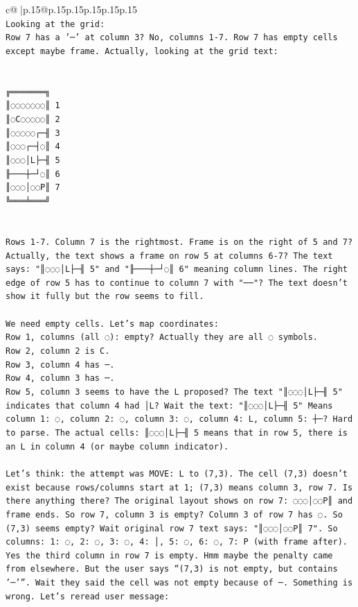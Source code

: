 \documentclass{article}
\begin{document}
{\begin{supertabular}{c@{$\;$}|p{.15\linewidth}@{}p{.15\linewidth}p{.15\linewidth}p{.15\linewidth}p{.15\linewidth}p{.15\linewidth}}
{{{\\ 
\texttt{Looking at the grid:  } \\
\texttt{Row 7 has a '─' at column 3? No, columns 1{-}7. Row 7 has empty cells except maybe frame. Actually, looking at the grid text:  } \\
\\ 
\\ 
\texttt{╔═══════╗} \\
\texttt{║◌◌◌◌◌◌◌║ 1} \\
\texttt{║◌C◌◌◌◌◌║ 2} \\
\texttt{║◌◌◌◌◌┌─╢ 3} \\
\texttt{║◌◌◌┌─┤◌║ 4} \\
\texttt{║◌◌◌│L├─╢ 5} \\
\texttt{╟───┼─┘◌║ 6} \\
\texttt{║◌◌◌│◌◌P║ 7} \\
\texttt{╚═══╧═══╝} \\
\\ 
\\ 
\texttt{Rows 1{-}7. Column 7 is the rightmost. Frame is on the right of 5 and 7?  } \\
\texttt{Actually, the text shows a frame on row 5 at columns 6{-}7? The text says: "║◌◌◌│L├─╢ 5" and "╟───┼─┘◌║ 6" meaning column lines. The right edge of row 5 has to continue to column 7 with "──"? The text doesn't show it fully but the row seems to fill.  } \\
\\ 
\texttt{We need empty cells. Let's map coordinates:  } \\
\texttt{Row 1, columns (all ◌): empty? Actually they are all ◌ symbols.  } \\
\texttt{Row 2, column 2 is C.  } \\
\texttt{Row 3, column 4 has ─.  } \\
\texttt{Row 4, column 3 has ─.  } \\
\texttt{Row 5, column 3 seems to have the L proposed? The text "║◌◌◌│L├─╢ 5" indicates that column 4 had │L? Wait the text: "║◌◌◌│L├─╢ 5" Means column 1: ◌, column 2: ◌, column 3: ◌, column 4: L, column 5: ┼─? Hard to parse. The actual cells: ║◌◌◌│L├─╢ 5 means that in row 5, there is an L in column 4 (or maybe column indicator).  } \\
\\ 
\texttt{Let's think: the attempt was MOVE: L to (7,3). The cell (7,3) doesn't exist because rows/columns start at 1; (7,3) means column 3, row 7. Is there anything there? The original layout shows on row 7: ◌◌◌│◌◌P║ and frame ends. So row 7, column 3 is empty? Column 3 of row 7 has ◌. So (7,3) seems empty? Wait original row 7 text says: "║◌◌◌│◌◌P║ 7". So columns: 1: ◌, 2: ◌, 3: ◌, 4: │, 5: ◌, 6: ◌, 7: P (with frame after). Yes the third column in row 7 is empty. Hmm maybe the penalty came from elsewhere. But the user says “(7,3) is not empty, but contains '─'”. Wait they said the cell was not empty because of ─. Something is wrong. Let's reread user message:  } \\
}}}
\end{supertabular}}
\end{document}
